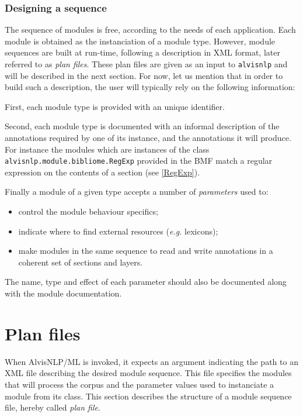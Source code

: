 \documentclass[a4paper]{book}
\begin{document}
\subsection{Designing a sequence}
The sequence of modules is free, according to the needs of each application.
Each module is obtained as the instanciation of a module type.
However, module sequences are built at run-time, following a description in XML format, later referred to as \emph{plan files}. 
These plan files are given as an input to \texttt{alvisnlp} and will be described in the next section. 
For now, let us mention that in order to build such a description, the user will typically rely on the following information:

First, each module type is provided with an unique identifier.

Second, each module type is documented with an informal description of the annotations required by one of its instance, and the annotations it will produce.
For instance the modules which are instances of the class \texttt{alvisnlp.module.bibliome.RegExp} provided in the BMF match a regular expression on the contents of a section (see \ref{RegExp}).

Finally a module of a given type accepts a number of \emph{parameters} used to:
\begin{itemize}
\item control the module behaviour specifics;
\item indicate where to find external resources (\emph{e.g.} lexicons);
\item make modules in the same sequence to read and write annotations in a coherent set of sections and layers.
\end{itemize}
The name, type and effect of each parameter should also be documented along with the module documentation.

\chapter{Plan files}
\label{PlanFile}
When AlvisNLP/ML is invoked, it expects an argument indicating the path to an XML file describing the desired module sequence.
This file specifies the modules that will process the corpus and the parameter values used to instanciate a module from its class.
This section describes the structure of a module sequence file, hereby called \emph{plan file}.
\end{document}
